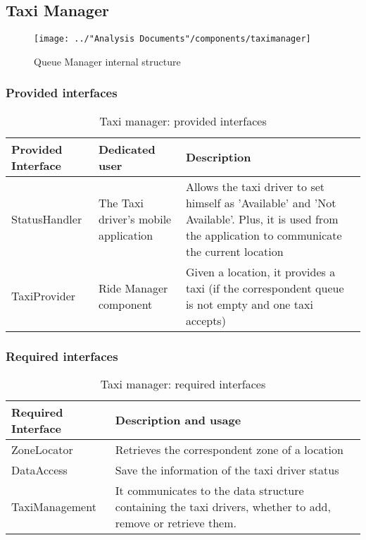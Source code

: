 \subsection{Taxi Manager}
\begin{figure}[H]
	\centering
	\texttt{[image: ../"Analysis Documents"/components/taximanager]}
	\label{fig:taximanager}
	\caption{Queue Manager internal structure}
\end{figure}
\subsubsection{Provided interfaces}
\begin{table}[H]
	\begin{longtable}{| p{} | p{} | p{} |}
		\hline
		\textbf{Provided Interface} & \textbf{Dedicated user} & \textbf{Description} \\ \hline
		StatusHandler & The Taxi driver's mobile application & Allows the taxi driver to set himself as 'Available' and 'Not Available'. Plus, it is used from the application to communicate the current location \\ \hline
		TaxiProvider & Ride Manager component & Given a location, it provides a taxi (if the correspondent queue is not empty and one taxi accepts) \\ \hline
	\end{longtable}
	\caption{Taxi manager: provided interfaces}
	\label{tab:taximanager:providedInterfaces}
\end{table}
\subsubsection{Required interfaces}
\begin{table}[H]
	\begin{longtable}{| l | p{} |}
		\hline
		\textbf{Required Interface} & \textbf{Description and usage} \\ \hline
		ZoneLocator & Retrieves the correspondent zone of a location \\ \hline
		DataAccess & Save the information of the taxi driver status \\ \hline
		TaxiManagement & It communicates to the data structure containing the taxi drivers, whether to add, remove or retrieve them. \\ \hline
	\end{longtable}
	\caption{Taxi manager: required interfaces}
	\label{tab:taximanager:requiredInterfaces}
\end{table}
